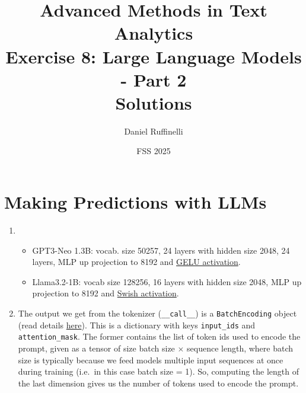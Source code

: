 \documentclass[11pt,a4paper]{article}
\title{Advanced Methods in Text Analytics \\ 
Exercise 8: Large Language Models - Part 2\\
\textbf{Solutions}}
\author{Daniel Ruffinelli}
\date{FSS 2025}
\begin{document}
\maketitle

\section{Making Predictions with LLMs}

\begin{enumerate}[label=(\alph*)]
    \item
          \begin{itemize}
              \item GPT3-Neo 1.3B: vocab. size 50257, 24 layers with hidden size
                    2048, 24 layers, MLP up projection to 8192 and
                    \href{https://docs.pytorch.org/docs/stable/generated/torch.nn.GELU.html#torch.nn.GELU}{GELU activation}.
              \item Llama3.2-1B: vocab size 128256, 16 layers with hidden size
                    2048, MLP up projection to 8192 and
                    \href{https://docs.pytorch.org/docs/stable/generated/torch.nn.SiLU.html}{Swish activation}.
          \end{itemize}
    \item The output we get from the tokenizer (\texttt{\_\_call\_\_}) is a
          \texttt{BatchEncoding} object (read details
          \href{https://huggingface.co/docs/transformers/v4.51.3/en/internal/tokenization_utils#transformers.PreTrainedTokenizerBase.__call__}{here}).
          This is a dictionary with keys \texttt{input\_ids} and
          \texttt{attention\_mask}.
          The former contains the list of token ids used to encode the prompt,
          given as a tensor of size batch size $\times$ sequence length, where
          batch size is typically because we feed models multiple input
          sequences at once during training (i.e.\ in this case batch size = 1).
          So, computing the length of the last dimension gives us the number of
          tokens used to encode the prompt.


\end{enumerate}
\end{document}
